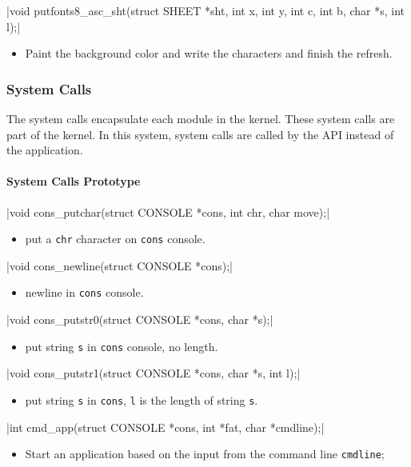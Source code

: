 \documentclass{swfcthesis}
\begin{document}
\csingle|void putfonts8_asc_sht(struct SHEET *sht, int x, int y, int c, int b, char *s, int l);|
\begin{itemize}
\item Paint the background color and write the characters and finish the refresh.
\end{itemize}

\subsubsection{System Calls}
\label{sec:system-call}

The system calls encapsulate each module in the kernel. These system calls are part of the
kernel. In this system, system calls are called by the API instead of the
application.

\paragraph{System Calls Prototype}

\csingle|void cons_putchar(struct CONSOLE *cons, int chr, char move);|
\begin{itemize}
\item put a \texttt{chr} character on \texttt{cons} console.
\end{itemize}

\csingle|void cons_newline(struct CONSOLE *cons);|
\begin{itemize}
\item newline in \texttt{cons} console.
\end{itemize}

\csingle|void cons_putstr0(struct CONSOLE *cons, char *s);|
\begin{itemize}
\item put string \texttt{s} in \texttt{cons} console, no length.
\end{itemize}

\csingle|void cons_putstr1(struct CONSOLE *cons, char *s, int l);|
\begin{itemize}
\item put string \texttt{s} in \texttt{cons}, \texttt{l} is the length of string
  \texttt{s}.
\end{itemize}

\csingle|int cmd_app(struct CONSOLE *cons, int *fat, char *cmdline);|
\begin{itemize}
\item Start an application based on the input from the command line \texttt{cmdline};
\end{itemize}
\end{document}
